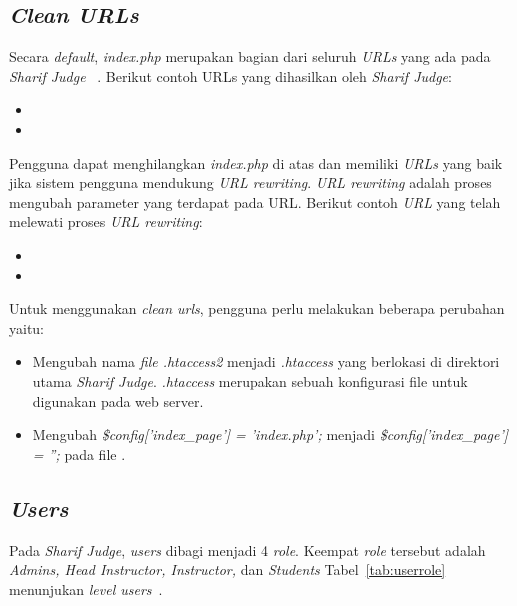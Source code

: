 \subsection{\textit{Clean URLs}}
Secara \textit{default}, \textit{index.php} merupakan bagian dari seluruh \textit{URLs} yang ada pada \textit{Sharif Judge} ~\cite{mjnaderi:14:sharifjudgedoc}. Berikut contoh URLs yang dihasilkan oleh \textit{Sharif Judge}:
\begin{itemize}
	\item {}
	\item {}
\end{itemize}

Pengguna dapat menghilangkan \textit{index.php} di atas dan memiliki \textit{URLs} yang baik jika sistem pengguna mendukung \textit{URL rewriting}. \textit{URL rewriting} adalah proses mengubah parameter yang terdapat pada URL. Berikut contoh \textit{URL} yang telah melewati proses \textit{URL rewriting}:
\begin{itemize}
	\item {}
	\item {}
\end{itemize}

Untuk menggunakan \textit{clean urls}, pengguna perlu melakukan beberapa perubahan yaitu:
\begin{itemize}
	\item Mengubah nama \textit{file .htaccess2} menjadi \textit{.htaccess} yang berlokasi di direktori utama \textit{Sharif Judge}. \textit{.htaccess} merupakan sebuah konfigurasi file untuk digunakan pada web server.
	\item Mengubah \textit{\$config['index\_page'] = 'index.php';} menjadi \textit{\$config['index\_page'] = '';} pada file .
\end{itemize}

\subsection{\textit{Users}}
Pada \textit{Sharif Judge}, \textit{users} dibagi menjadi 4 \textit{role}. Keempat \textit{role} tersebut adalah \textit{Admins, Head Instructor, Instructor, }dan \textit{Students}
Tabel~\ref{tab:userrole} menunjukan \textit{level users}~\cite{mjnaderi:14:sharifjudgedoc}.

